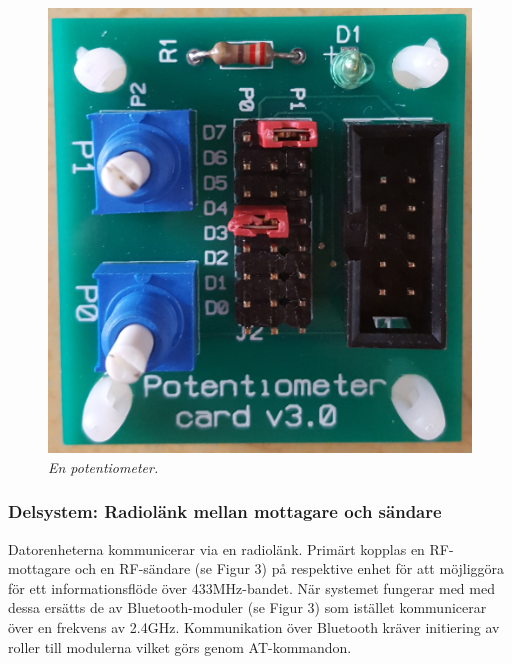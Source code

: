 \documentclass[a4paper]{article}
\begin{document}
\begin{figure}[H]
\includegraphics[scale=0.04]{Potentiometer.jpg}
\centering
\caption{\it En potentiometer.}
\end{figure} 




\subsubsection{Delsystem: Radiolänk mellan mottagare och sändare}
Datorenheterna kommunicerar via en radiolänk. Primärt kopplas en RF-mottagare och en RF-sändare (se Figur 3) på respektive enhet för att möjliggöra för ett informationsflöde över 433MHz-bandet. När systemet fungerar med med dessa ersätts de av Bluetooth-moduler (se Figur 3) som istället kommunicerar över en frekvens av 2.4GHz. Kommunikation över Bluetooth kräver initiering av roller till modulerna vilket görs genom AT-kommandon. 
\end{document}
